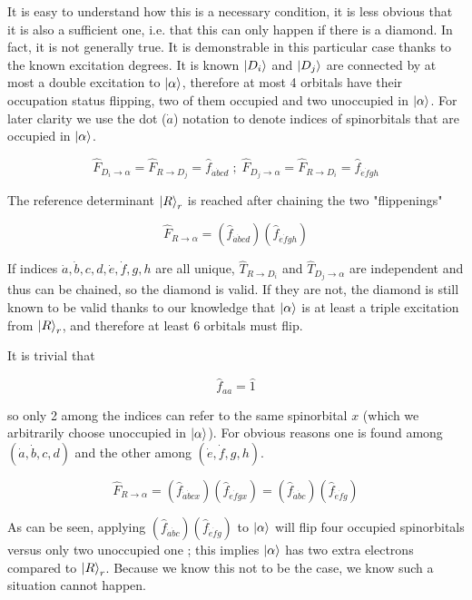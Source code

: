 \documentclass[./thesis.tex]{subfiles}
\begin{document}
It is easy to understand how this is a necessary condition, it is less obvious that it is also a sufficient one, i.e. that this can only happen if there is a diamond. In fact, it is not generally true. It is demonstrable in this particular case thanks to the known excitation degrees. It is known $\ket {D_i}$ and $\ket {D_j}$ are connected by at most a double excitation to ${\ket{\alpha}}$, therefore at most 4 orbitals have their occupation status flipping, two of them occupied and two unoccupied in ${\ket{\alpha}}$. For later clarity we use the dot ($\dot a$) notation to denote indices of spinorbitals that are occupied in ${\ket{\alpha}}$.

\begin{equation}
\hat F_{D_i \rightarrow \alpha} = \hat F_{R \rightarrow D_j} = \hat f_{\dot a \dot bcd} \; ; \; \hat F_{D_j \rightarrow \alpha} = \hat F_{R \rightarrow D_i} = \hat f_{\dot e \dot fgh}
\end{equation}

The reference determinant $\ket R_r$ is reached after chaining the two "flippenings"

\begin{equation}
\hat F_{R \rightarrow \alpha} = (\hat f_{\dot a \dot bcd})(\hat f_{\dot e \dot fgh})
\end{equation}

If indices $\dot a,\dot b,c,d,\dot e,\dot f,g,h$ are all unique, $\hat T_{R \rightarrow D_i}$ and $\hat T_{D_j \rightarrow \alpha}$ are independent and thus can be chained, so the diamond is valid. If they are not, the diamond is still known to be valid thanks to our knowledge that ${\ket{\alpha}}$ is at least a triple excitation from $\ket R_r$, and therefore at least 6 orbitals must flip. 

It is trivial that

\begin{equation}
\hat f_{aa} = \hat 1
\end{equation}

so only 2 among the indices can refer to the same spinorbital $x$ (which we arbitrarily choose unoccupied in ${\ket{\alpha}}$). For obvious reasons one is found among $(\dot a,\dot b,c,d)$ and the other among $(\dot e,\dot f,g,h)$.

\begin{equation}
\hat F_{R \rightarrow \alpha} = (\hat f_{\dot a \dot bcx})(\hat f_{\dot e \dot fgx}) = (\hat f_{\dot a \dot bc})(\hat f_{\dot e \dot fg})
\end{equation}

As can be seen, applying $(\hat f_{\dot a \dot bc})(\hat f_{\dot e \dot fg})$ to ${\ket{\alpha}}$ will flip four occupied spinorbitals versus only two unoccupied one ; this implies ${\ket{\alpha}}$ has two extra electrons compared to $\ket R_r$. Because we know this not to be the case, we know such a situation cannot happen.
\end{document}
